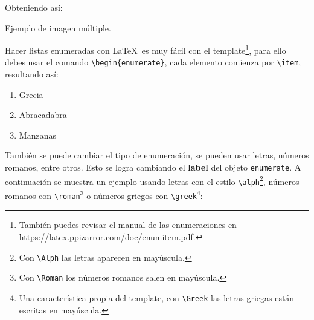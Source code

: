 	Obteniendo así: \\

	\begin{images}{Ejemplo de imagen múltiple.}
		\imagesnewline
	\end{images}


\clearpage
{}


	Hacer listas enumeradas con \LaTeX\ es muy fácil con el template\footnote{También puedes revisar el manual de las enumeraciones en \url{https://latex.ppizarror.com/doc/enumitem.pdf}.}, para ello debes usar el comando \texttt{\textbackslash begin\{enumerate\}}, cada elemento comienza por \texttt{\textbackslash item}, resultando así:

	\begin{enumerate}
		\item Grecia
		\item Abracadabra
		\item Manzanas
	\end{enumerate}

	También se puede cambiar el tipo de enumeración, se pueden usar letras, números romanos, entre otros. Esto se logra cambiando el \textbf{label} del objeto \texttt{enumerate}. A continuación se muestra un ejemplo usando letras con el estilo \texttt{\textbackslash alph}\footnote{Con \texttt{\textbackslash Alph} las letras aparecen en mayúscula.}, números romanos con \texttt{\textbackslash roman}\footnote{Con \texttt{\textbackslash Roman} los números romanos salen en mayúscula.} o números griegos con \texttt{\textbackslash greek}\footnote{Una característica propia del template, con \texttt{\textbackslash Greek} las letras griegas están escritas en mayúscula.}:

